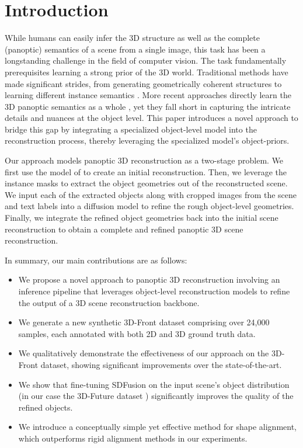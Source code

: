 \section{Introduction}
\label{sec:intro}


While humans can easily infer the 3D structure as well as the complete (panoptic) semantics of a scene from a single image, this task has been a longstanding
challenge in the field of computer vision. The task fundamentally prerequisites learning a strong prior of the 3D world. Traditional methods have made significant strides,
from generating geometrically coherent structures \citep{denninger20203d, shin20193d} to learning different instance semantics \citep{gkioxari2019mesh, kuo2020mask2cad,
nie2020total3dunderstanding}. More recent approaches directly learn the 3D panoptic semantics as a whole \citep{dahnert2021panoptic, zhang2023uni}, yet they fall short in capturing the intricate details and nuances at the object level.
This paper introduces a novel approach to bridge this gap by integrating a specialized object-level model into the reconstruction process, thereby leveraging the specialized model's object-priors.

Our approach models panoptic 3D reconstruction as a two-stage problem. We first use the model of \citet{dahnert2021panoptic} to create an initial reconstruction. Then, we leverage the instance masks to extract the object geometries out of the reconstructed scene. We input each of the extracted objects along with cropped images from the scene and text labels into a diffusion model \citep{cheng2023sdfusion} to refine the rough object-level geometries.
Finally, we integrate the refined object geometries back into the initial scene reconstruction to obtain a complete and refined panoptic 3D scene reconstruction.

In summary, our main contributions are as follows:
\begin{itemize}
    \item We propose a novel approach to panoptic 3D reconstruction involving an inference pipeline that leverages object-level reconstruction models to refine the output of a 3D scene reconstruction backbone.
    \item We generate a new synthetic 3D-Front \citep{fu20213d} dataset comprising over 24,000 samples, each annotated with both 2D and 3D ground truth data.
    \item We qualitatively demonstrate the effectiveness of our approach on the 3D-Front \citep{fu20213d} dataset, showing significant improvements over the state-of-the-art.
    \item We show that fine-tuning SDFusion \citep{cheng2023sdfusion} on the input scene's object distribution (in our case the 3D-Future dataset \citep{fu20213e}) significantly improves the quality of the refined objects.
    \item We introduce a conceptually simple yet effective method for shape alignment, which outperforms rigid alignment methods in our experiments.
\end{itemize}
